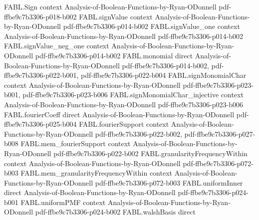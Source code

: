 \begin{theorem}
\label{FABL.noiseSensitivity_eq_half_sub_half_noiseStability}
\leanok
{}
\proofstep
  {FABL.Sign}
  {context}
  {Analysis-of-Boolean-Functions-by-Ryan-ODonnell}
  {pdf-ffbe9c7b3306-p018-b002}
\proofstep
  {FABL.signValue}
  {context}
  {Analysis-of-Boolean-Functions-by-Ryan-ODonnell}
  {pdf-ffbe9c7b3306-p014-b002}
\proofstep
  {FABL.signValue_one}
  {context}
  {Analysis-of-Boolean-Functions-by-Ryan-ODonnell}
  {pdf-ffbe9c7b3306-p014-b002}
\proofstep
  {FABL.signValue_neg_one}
  {context}
  {Analysis-of-Boolean-Functions-by-Ryan-ODonnell}
  {pdf-ffbe9c7b3306-p014-b002}
\proofstep
  {FABL.monomial}
  {direct}
  {Analysis-of-Boolean-Functions-by-Ryan-ODonnell}
  {pdf-ffbe9c7b3306-p014-b002,
    pdf-ffbe9c7b3306-p022-b001,
    pdf-ffbe9c7b3306-p022-b004}
\proofstep
  {FABL.signMonomialChar}
  {context}
  {Analysis-of-Boolean-Functions-by-Ryan-ODonnell}
  {pdf-ffbe9c7b3306-p023-b001,
    pdf-ffbe9c7b3306-p023-b006}
\proofstep
  {FABL.signMonomialChar_injective}
  {context}
  {Analysis-of-Boolean-Functions-by-Ryan-ODonnell}
  {pdf-ffbe9c7b3306-p023-b006}
\proofstep
  {FABL.fourierCoeff}
  {direct}
  {Analysis-of-Boolean-Functions-by-Ryan-ODonnell}
  {pdf-ffbe9c7b3306-p025-b004}
\proofstep
  {FABL.fourierSupport}
  {context}
  {Analysis-of-Boolean-Functions-by-Ryan-ODonnell}
  {pdf-ffbe9c7b3306-p022-b002,
    pdf-ffbe9c7b3306-p027-b008}
\proofstep
  {FABL.mem_fourierSupport}
  {context}
  {Analysis-of-Boolean-Functions-by-Ryan-ODonnell}
  {pdf-ffbe9c7b3306-p022-b002}
\proofstep
  {FABL.granularityFrequencyWithin}
  {context}
  {Analysis-of-Boolean-Functions-by-Ryan-ODonnell}
  {pdf-ffbe9c7b3306-p072-b003}
\proofstep
  {FABL.mem_granularityFrequencyWithin}
  {context}
  {Analysis-of-Boolean-Functions-by-Ryan-ODonnell}
  {pdf-ffbe9c7b3306-p072-b003}
\proofstep
  {FABL.uniformInner}
  {direct}
  {Analysis-of-Boolean-Functions-by-Ryan-ODonnell}
  {pdf-ffbe9c7b3306-p024-b001}
\proofstep
  {FABL.uniformPMF}
  {context}
  {Analysis-of-Boolean-Functions-by-Ryan-ODonnell}
  {pdf-ffbe9c7b3306-p024-b002}
\proofstep
  {FABL.walshBasis}
  {direct}

\end{theorem}
